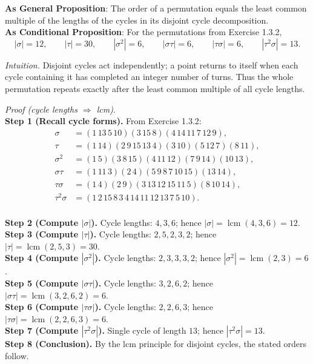 \documentclass[12pt]{article}
\theoremstyle{definition}
\begin{document}
\noindent\textbf{As General Proposition}: The order of a permutation equals the least common multiple of the lengths of the cycles in its disjoint cycle decomposition.\\

\noindent \textbf{As Conditional Proposition}: For the permutations from Exercise 1.3.2,
\[
|\sigma|=12,\qquad |\tau|=30,\qquad |\sigma^{2}|=6,\qquad |\sigma\tau|=6,\qquad |\tau\sigma|=6,\qquad |\tau^{2}\sigma|=13.
\]

\newpage

\dotfill

\emph{Intuition.} Disjoint cycles act independently; a point returns to itself when each cycle containing it has completed an integer number of turns. Thus the whole permutation repeats exactly after the least common multiple of all cycle lengths.\\

\dotfill

\emph{Proof (cycle lengths $\Rightarrow$ lcm).}\\
\textbf{Step 1 (Recall cycle forms).} From Exercise 1.3.2:
\[
\begin{aligned}
\sigma&=(1\,13\,5\,10)(3\,15\,8)(4\,14\,11\,7\,12\,9),\\
\tau&=(1\,14)(2\,9\,15\,13\,4)(3\,10)(5\,12\,7)(8\,11),\\
\sigma^{2}&=(1\,5)(3\,8\,15)(4\,11\,12)(7\,9\,14)(10\,13),\\
\sigma\tau&=(1\,11\,3)(2\,4)(5\,9\,8\,7\,10\,15)(13\,14),\\
\tau\sigma&=(1\,4)(2\,9)(3\,13\,12\,15\,11\,5)(8\,10\,14),\\
\tau^{2}\sigma&=(1\,2\,15\,8\,3\,4\,14\,11\,12\,13\,7\,5\,10).
\end{aligned}
\]\\
\textbf{Step 2 (Compute $|\sigma|$).} Cycle lengths: $4,3,6$; hence $|\sigma|=\operatorname{lcm}(4,3,6)=12$.\\
\textbf{Step 3 (Compute $|\tau|$).} Cycle lengths: $2,5,2,3,2$; hence $|\tau|=\operatorname{lcm}(2,5,3)=30$.\\
\textbf{Step 4 (Compute $|\sigma^{2}|$).} Cycle lengths: $2,3,3,3,2$; hence $|\sigma^{2}|=\operatorname{lcm}(2,3)=6$.\\
\textbf{Step 5 (Compute $|\sigma\tau|$).} Cycle lengths: $3,2,6,2$; hence $|\sigma\tau|=\operatorname{lcm}(3,2,6,2)=6$.\\
\textbf{Step 6 (Compute $|\tau\sigma|$).} Cycle lengths: $2,2,6,3$; hence $|\tau\sigma|=\operatorname{lcm}(2,2,6,3)=6$.\\
\textbf{Step 7 (Compute $|\tau^{2}\sigma|$).} Single cycle of length $13$; hence $|\tau^{2}\sigma|=13$.\\
\textbf{Step 8 (Conclusion).} By the lcm principle for disjoint cycles, the stated orders follow.
\end{document}
